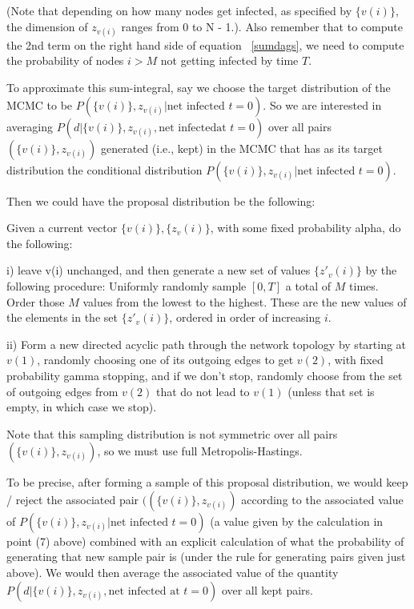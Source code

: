 \documentclass{article}
\begin{document}
        (Note that depending on how many nodes get infected, as specified by
        $\{v(i)\}$, the dimension of $z_{v(i)}$ ranges from 0 to N - 1.).  
        Also remember that to compute the 2nd term on the right hand side of
        equation ~\eqref{sumdags}, we need to compute the probability of nodes
        $i >M$ not getting infected by time $T$.

        To approximate this sum-integral, say we choose the target
        distribution of the MCMC to be 
        $P(\{v(i)\}, z_{v(i)} | \text{net infected } t=0).$
        So we are interested in averaging 
        $P(d | \{v(i)\}, z_{v(i)}, \text{net infectedat } t = 0)$
        over all pairs $(\{v(i)\}, z_{v(i)})$ generated (i.e., kept) in
        the MCMC that has as its target distribution the conditional
        distribution $P(\{v(i)\}, z_{v(i)} | \text{net infected } t=0)$.

        Then we could have the proposal distribution be the following:

        Given a current vector $\{v(i)\}, \{z_v(i)\}$, with some fixed 
        probability alpha, do the following:

        i) leave {v(i)} unchanged, and then generate a new set of values
        $\{z'_v(i)\}$ by the following procedure:
        Uniformly randomly sample $[0, T]$ a total of $M$ times. Order
        those $M$ values from the lowest to the highest. These are the new
        values of the elements in the set $\{z'_v(i)\}$, ordered in order of
        increasing $i$.

        ii) Form a new directed acyclic path through the network topology by
        starting at $v(1)$, randomly choosing one of its outgoing edges to get
        $v(2)$, with fixed probability gamma stopping, and if we don't stop,
        randomly choose from  the set of outgoing edges from $v(2)$ that do
        not lead to $v(1)$ (unless that set is empty, in which case we stop).

        Note that this sampling distribution is not symmetric over all pairs
        $(\{v(i)\}, z_{v(i)})$, so we must use full Metropolis-Hastings.

        To be precise, after forming a sample of this proposal distribution,
        we would keep / reject the associated pair $((\{v(i)\}, z_{v(i)})$
        according to the associated value of 
        $P(\{v(i)\}, z_{v(i)} | \text{net infected } t=0)$ 
        (a value given by the calculation  in point (7) above) combined with an 
        explicit calculation of what the probability of generating that new sample 
        pair is (under the rule for generating pairs given just above). We would 
        then average the associated  value of the quantity 
        $P(d | \{v(i)\}, z_{v(i)}, \text{net infected at } t = 0)$ over all kept
        pairs.
\end{document}
